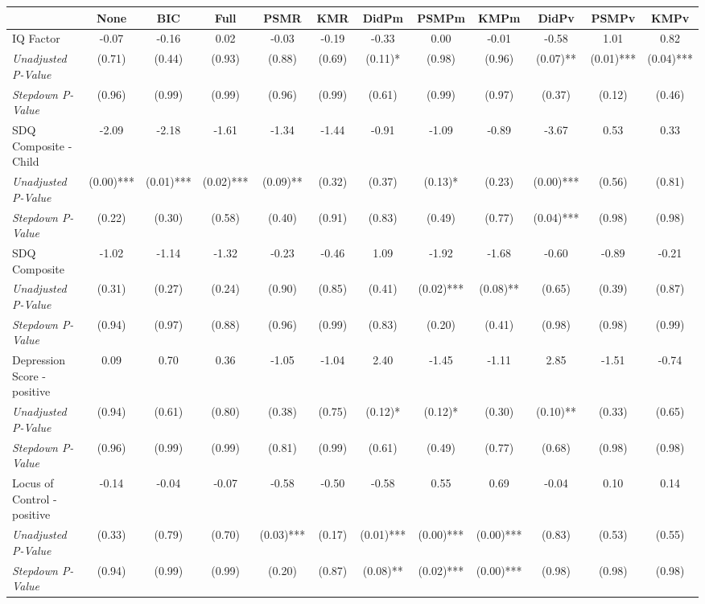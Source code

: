 \begin{tabular}{l c c c c c c c c c c c}
\toprule
 & None & BIC & Full & PSMR & KMR & DidPm & PSMPm & KMPm & DidPv & PSMPv & KMPv \\
\midrule
IQ Factor & -0.07 & -0.16 & 0.02 & -0.03 & -0.19 & -0.33 & 0.00 & -0.01 & -0.58 & 1.01 & 0.82 \\
\quad \textit{Unadjusted P-Value} & (0.71) & (0.44) & (0.93) & (0.88) & (0.69) & (0.11)* & (0.98) & (0.96) & (0.07)** & (0.01)*** & (0.04)*** \\
\quad \textit{Stepdown P-Value} & (0.96) & (0.99) & (0.99) & (0.96) & (0.99) & (0.61) & (0.99) & (0.97) & (0.37) & (0.12) & (0.46) \\
SDQ Composite - Child & -2.09 & -2.18 & -1.61 & -1.34 & -1.44 & -0.91 & -1.09 & -0.89 & -3.67 & 0.53 & 0.33 \\
\quad \textit{Unadjusted P-Value} & (0.00)*** & (0.01)*** & (0.02)*** & (0.09)** & (0.32) & (0.37) & (0.13)* & (0.23) & (0.00)*** & (0.56) & (0.81) \\
\quad \textit{Stepdown P-Value} & (0.22) & (0.30) & (0.58) & (0.40) & (0.91) & (0.83) & (0.49) & (0.77) & (0.04)*** & (0.98) & (0.98) \\
SDQ Composite & -1.02 & -1.14 & -1.32 & -0.23 & -0.46 & 1.09 & -1.92 & -1.68 & -0.60 & -0.89 & -0.21 \\
\quad \textit{Unadjusted P-Value} & (0.31) & (0.27) & (0.24) & (0.90) & (0.85) & (0.41) & (0.02)*** & (0.08)** & (0.65) & (0.39) & (0.87) \\
\quad \textit{Stepdown P-Value} & (0.94) & (0.97) & (0.88) & (0.96) & (0.99) & (0.83) & (0.20) & (0.41) & (0.98) & (0.98) & (0.99) \\
Depression Score - positive & 0.09 & 0.70 & 0.36 & -1.05 & -1.04 & 2.40 & -1.45 & -1.11 & 2.85 & -1.51 & -0.74 \\
\quad \textit{Unadjusted P-Value} & (0.94) & (0.61) & (0.80) & (0.38) & (0.75) & (0.12)* & (0.12)* & (0.30) & (0.10)** & (0.33) & (0.65) \\
\quad \textit{Stepdown P-Value} & (0.96) & (0.99) & (0.99) & (0.81) & (0.99) & (0.61) & (0.49) & (0.77) & (0.68) & (0.98) & (0.98) \\
Locus of Control - positive & -0.14 & -0.04 & -0.07 & -0.58 & -0.50 & -0.58 & 0.55 & 0.69 & -0.04 & 0.10 & 0.14 \\
\quad \textit{Unadjusted P-Value} & (0.33) & (0.79) & (0.70) & (0.03)*** & (0.17) & (0.01)*** & (0.00)*** & (0.00)*** & (0.83) & (0.53) & (0.55) \\
\quad \textit{Stepdown P-Value} & (0.94) & (0.99) & (0.99) & (0.20) & (0.87) & (0.08)** & (0.02)*** & (0.00)*** & (0.98) & (0.98) & (0.98) \\

\end{tabular}
